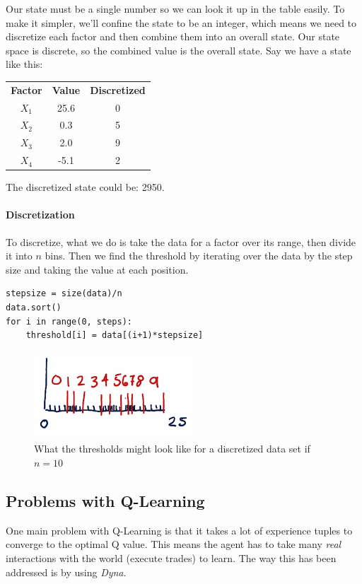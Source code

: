 \noindent Our state must be a single number so we can look it up in the table easily. To make it simpler, we'll confine the state to be an integer, which means we need to discretize each factor and then combine them into an overall state. Our state space is discrete, so the combined value is the overall state. Say we have a state like this:

\begin{table}[h]
\centering
\begin{tabular}{ccc}
\textbf{Factor} & \textbf{Value} & \textbf{Discretized}\\
$X_1$ & 25.6 & 0\\
$X_2$ & 0.3 & 5\\
$X_3$ & 2.0 & 9\\
$X_4$ & -5.1 & 2
\end{tabular}
\end{table}

\noindent The discretized state could be: 2950.

\paragraph{Discretization} To discretize, what we do is take the data for a factor over its range, then divide it into $n$ bins. Then we find the threshold by iterating over the data by the step size and taking the value at each position.

\begin{lstlisting}[style=python]
stepsize = size(data)/n
data.sort()
for i in range(0, steps):
	threshold[i] = data[(i+1)*stepsize]
\end{lstlisting}

\begin{figure}[h]
\centering
\includegraphics[width=6cm]{images/discretization.png}
\caption{What the thresholds might look like for a discretized data set if $n = 10$}
\end{figure}

\subsection{Problems with Q-Learning}
\noindent One main problem with Q-Learning is that it takes a lot of experience tuples to converge to the optimal Q value. This means the agent has to take many \textit{real} interactions with the world (execute trades) to learn. The way this has been addressed is by using \textit{Dyna}.

